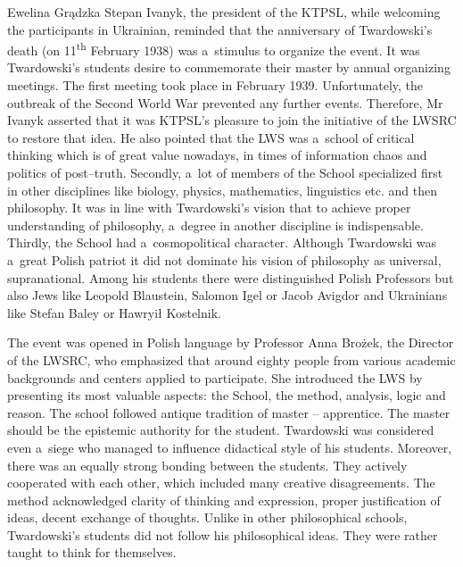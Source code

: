 \begin{editorialeng}{Ewelina Grądzka}
Stepan Ivanyk, the president of the KTPSL, while welcoming the participants in Ukrainian, reminded that the anniversary of Twardowski’s death (on 11\textsuperscript{th} February 1938) was a~stimulus to organize the event. It was Twardowski’s students desire to commemorate their master by annual organizing meetings. The first meeting took place in February 1939. Unfortunately, the outbreak of the Second World War prevented any further events. Therefore, Mr Ivanyk asserted that it was KTPSL’s pleasure to join the initiative of the LWSRC to restore that idea. He also pointed that the LWS was a~school of critical thinking which is of great value nowadays, in times of information chaos and politics of post--truth. Secondly, a~lot of members of the School specialized first in other disciplines like biology, physics, mathematics, linguistics etc. and then philosophy. It was in line with Twardowski’s vision that to achieve proper understanding of philosophy, a~degree in another discipline is indispensable. Thirdly, the School had a~cosmopolitical character. Although Twardowski was a~great Polish patriot it did not dominate his vision of philosophy as universal, supranational. Among his students there were distinguished Polish Professors but also Jews like Leopold Blaustein, Salomon Igel or Jacob Avigdor and Ukrainians like Stefan Baley or Hawryił Kostelnik.

The event was opened in Polish language by Professor Anna Brożek, the Director of the LWSRC, who emphasized that around eighty people from various academic backgrounds and centers applied to participate. She introduced the LWS by presenting its most valuable aspects: the School, the method, analysis, logic and reason. The school followed antique tradition of master – apprentice. The master should be the epistemic authority for the student. Twardowski was considered even a~siege who managed to influence didactical style of his students. Moreover, there was an equally strong bonding between the students. They actively cooperated with each other, which included many creative disagreements. The method acknowledged clarity of thinking and expression, proper justification of ideas, decent exchange of thoughts. Unlike in other philosophical schools, Twardowski’s students did not follow his philosophical ideas. They were rather taught to think for themselves.


\end{editorialeng}
